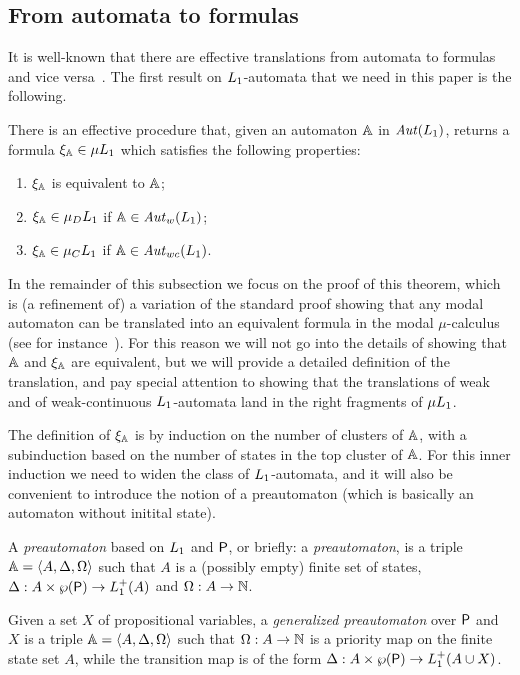 \subsection{From automata to formulas}
   \label{sec:parity-to-mc}

It is well-known that there are effective translations from automata to formulas
and vice versa~\cite{ALG02}.
The first result on $L_{1}$-automata that we need in this paper is the 
following.

\begin{theorem}\label{t:autofor}
There is an effective procedure that, given an automaton $\mathbb{A}$ in 
$\mathit{Aut}(L_{1})$, returns a formula $\xi_{\mathbb{A}} \in \mu L_{1}$ which satisfies
the following properties:
\begin{enumerate}[(1)]
    
\item $\xi_{\mathbb{A}}$ is equivalent to $\mathbb{A}$;

\item $\xi_{\mathbb{A}} \in \mu_{D}L_{1}$ if $\mathbb{A} \in \mathit{Aut}_{w}(L_{1})$;

\item $\xi_{\mathbb{A}} \in \mu_{C}L_{1}$ if $\mathbb{A} \in \mathit{Aut}_{wc}(L_{1})$.
\end{enumerate}
\end{theorem}

In the remainder of this subsection
we focus on the proof of this theorem, which is (a refinement of)
a variation of the standard proof showing that any modal automaton can be 
translated into an equivalent formula in the modal $\mu$-calculus (see for
instance~\cite[Section 6]{Ven08}). 
For this reason we will not go into the details of showing that $\mathbb{A}$ and 
$\xi_{\mathbb{A}}$ are equivalent, but we will provide a detailed definition of the 
translation, and pay special attention to showing that the translations of weak
and of weak-continuous $L_{1}$-automata land in the right fragments of 
$\mu L_{1}$. 

The definition of $\xi_{\mathbb{A}}$ is by induction on the number of clusters of
$\mathbb{A}$, with a subinduction based on the number of states in the top cluster 
of $\mathbb{A}$.
For this inner induction we need to widen the class of $L_{1}$-automata, and
it will also be convenient to introduce the notion of a preautomaton (which is  
basically an automaton without initital state).

\begin{definition}
A \emph{preautomaton} based on $L_{1}$ and $\mathsf{P}$, or briefly: a
\emph{preautomaton}, is a triple $\mathbb{A} = \langle{A,\Delta,\Omega}\rangle$ such that $A$ is
a (possibly empty) finite set of states, $\Delta: A\times \wp(\mathsf{P}) \to 
L_{1}^+(A)$ and $\Omega: A \to \mathbb{N}$.

Given a set $X$ of propositional variables, a \emph{generalized preautomaton} 
over $\mathsf{P}$ and $X$ is a triple $\mathbb{A} = \langle{A,\Delta,\Omega}\rangle$ such that $\Omega:
A \to \mathbb{N}$ is a priority map on the finite state set $A$, while the transition 
map is of the form $\Delta: A\times \wp(\mathsf{P}) \to L_{1}^+(A\cup X)$.
\end{definition}

